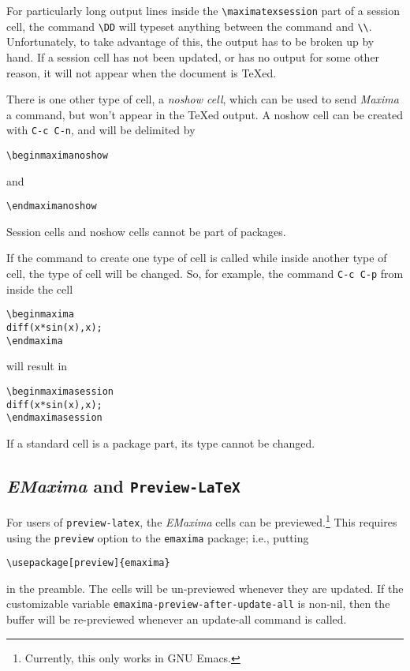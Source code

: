 \documentclass{article}
\newcommand{\emx}{\textsl{\sffamily EMaxima}}
\newcommand{\mx}{\textsl{\sffamily Maxima}}
\begin{document}
For particularly long output lines inside the \verb+\maximatexsession+
part of a session cell, the command \verb+\DD+ will typeset anything
between the command and \verb+\\+.  Unfortunately, to take advantage
of this, the output has to be broken up by hand.
If a session cell has not been updated, or has no output for some
other reason, it will not appear when the document is \TeX{}ed.

There is one other type of cell, a \emph{noshow cell}, which can be
used to send \mx{} a command, but won't appear in the \TeX{}ed
output. A noshow cell can be created with \texttt{C-c C-n}, and will
be delimited by
\begin{verbatim}
\beginmaximanoshow
\end{verbatim}
\noindent
and
\begin{verbatim}
\endmaximanoshow
\end{verbatim}

Session cells and noshow cells cannot be part of packages.

If the command to create one type of cell is called while inside
another type of cell, the type of cell will be changed.  So, for
example, the command \texttt{C-c C-p} from inside the cell
\begin{verbatim}
\beginmaxima
diff(x*sin(x),x);
\endmaxima
\end{verbatim}
\noindent
will result in
\begin{verbatim}
\beginmaximasession
diff(x*sin(x),x);
\endmaximasession
\end{verbatim}
\noindent
If a standard cell is a package part, its type cannot be changed.

\subsection{\emx{} and \texttt{Preview-LaTeX}}

For users of \texttt{preview-latex}, the \emx{} cells can be
previewed.\footnote{Currently, this only works in GNU Emacs.}
This requires using the \texttt{preview} option to the
\texttt{emaxima} package; i.e., putting
\begin{verbatim}
\usepackage[preview]{emaxima}
\end{verbatim}
in the preamble.  
The cells will be un-previewed whenever they are updated.
If the customizable variable \texttt{emaxima-preview-after-update-all}
is non-nil, then the buffer will be re-previewed whenever an
update-all command is called.
\end{document}
